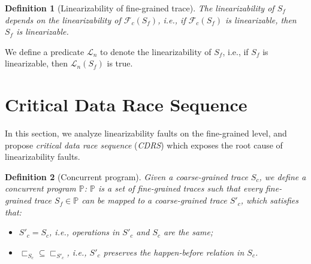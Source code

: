 \documentclass[runningheads]{llncs}
\newcommand{\p}{\mathbb{P} }
\newcommand{\ft}{S_f}
\newcommand{\ct}{S_c}
\newtheorem{myDef}{Definition}
\begin{document}
\begin{myDef}[Linearizability of fine-grained trace]
The linearizability of $S_f$ depends on the linearizability of $\mathcal{F}_c(S_f)$, i.e., if $\mathcal{F}_c(S_f)$ is linearizable, then $S_f$ is linearizable. \end{myDef}

We define a predicate $\mathcal{L}_n$ to denote the linearizability of $S_f$, i.e., if $S_f$ is linearizable, then $\mathcal{L}_n(S_f)$ is true.

\section{Critical Data Race Sequence}\label{sec:criticaldataraces}



In this section, we analyze linearizability faults on the fine-grained level, and propose \textit{critical data race sequence} (\textit{CDRS}) which exposes the root cause of linearizability faults.



\begin{myDef}[Concurrent program]\label{def:concurrentprogram}
Given a coarse-grained trace $\ct$, we define a concurrent program $\p$:
$\p$ 
 is a set of fine-grained traces such that
every fine-grained trace $\ft \in \p$ can be mapped to a coarse-grained trace $S'_c$, which satisfies that: 
\begin{itemize}
  \item $S'_c = S_c$, i.e., operations in $S'_c$ and $S_c$ are the same;
  \item $\sqsubset_{S_c}\subseteq \sqsubset_{S'_c}$, i.e., $S'_c$ preserves the \textit{happen-before} relation in $S_c$.
\end{itemize}
\end{myDef}
\end{document}
